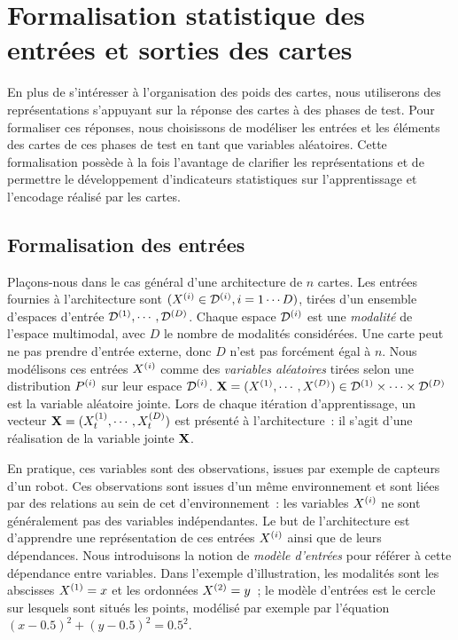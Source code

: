 \documentclass[../main]{subfiles}
\begin{document}
\section{Formalisation statistique des entrées et sorties des cartes}

En plus de s'intéresser à l'organisation des poids des cartes, nous utiliserons des représentations s'appuyant sur la réponse des cartes à des phases de test.
Pour formaliser ces réponses, nous choisissons de modéliser les entrées et les éléments des cartes de ces phases de test en tant que variables aléatoires.
Cette formalisation possède à la fois l'avantage de clarifier les représentations et de permettre le développement d'indicateurs statistiques sur l'apprentissage et l'encodage réalisé par les cartes.

\subsection{Formalisation des entrées}

Plaçons-nous dans le cas général d'une architecture de $n$ cartes.
Les entrées fournies à l'architecture sont $(X^{({i})} \in \mathcal{D}^{({i})}, i = 1 \cdots D)$, tirées d'un ensemble d'espaces d'entrée $\mathcal{D}^{({1})},\cdots,\mathcal{D}^{({D})}$. 
Chaque espace $\mathcal{D}^{({i})}$ est une \emph{modalité} de l'espace multimodal, avec $D$ le nombre de modalités considérées. Une carte peut ne pas prendre d'entrée externe, donc $D$ n'est pas forcément égal à $n$. 
Nous modélisons ces entrées $X^{({i})}$ comme des \emph{variables aléatoires} tirées selon une distribution $P^{({i})}$ sur leur espace $\mathcal{D}^{({i})}$.
$\mathbf{X} = (X^{({1})}, \cdots, X^{({D})}) \in \mathcal{D}^{({1})} \times \cdots \times \mathcal{D}^{({D})}$ est la variable aléatoire jointe. 
Lors de chaque itération d'apprentissage, un vecteur $\mathbf{X} = (X^{({1})}_t, \cdots , X^{({D})}_t)$ est présenté à l'architecture~: il s'agit d'une réalisation de la variable jointe $\mathbf{X}$.

En pratique, ces variables sont des observations, issues par exemple de capteurs d'un robot. Ces observations sont issues d'un même environnement et sont liées par des relations au sein de cet d'environnement~: les variables $X^{({i})}$ ne sont généralement pas des variables indépendantes.
Le but de l'architecture est d'apprendre une représentation de ces entrées $X^{({i})}$ ainsi que de leurs dépendances.
Nous introduisons la notion de \emph{modèle d'entrées} pour référer à cette dépendance entre variables.
Dans l'exemple d'illustration, les modalités sont les abscisses $X^{({1})} = x$ et les ordonnées $X^{({2})} = y$~; le modèle d'entrées est le cercle sur lesquels sont situés les points, modélisé par exemple par l'équation $(x - 0.5)^2 + (y - 0.5)^2 = 0.5^2$.
\end{document}
